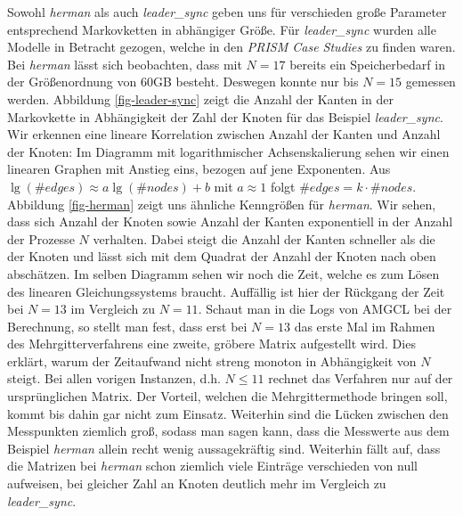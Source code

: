 \documentclass[a4paper]{article}
\theoremstyle{nonumberplain}
\begin{document}
Sowohl \textit{herman} als auch \textit{leader\_sync} geben uns für verschieden große Parameter entsprechend Markovketten in abhängiger Größe. Für \textit{leader\_sync} wurden alle Modelle in Betracht gezogen, welche in den \textit{PRISM Case Studies} \cite{PRISMCS} zu finden waren. Bei \textit{herman} lässt sich beobachten, dass mit $N=17$ bereits ein Speicherbedarf in der Größenordnung von 60GB besteht. Deswegen konnte nur bis $N=15$ gemessen werden. Abbildung \ref{fig-leader-sync} zeigt die Anzahl der Kanten in der Markovkette in Abhängigkeit der Zahl der Knoten für das Beispiel \textit{leader\_sync}. Wir erkennen eine lineare Korrelation zwischen Anzahl der Kanten und Anzahl der Knoten: Im Diagramm mit logarithmischer Achsenskalierung sehen wir einen linearen Graphen mit Anstieg eins, bezogen auf jene Exponenten. Aus $\lg (\#edges) \approx a \lg (\#nodes) + b$ mit $a \approx 1$ folgt $\#edges = k \cdot \#nodes$. Abbildung \ref{fig-herman} zeigt uns ähnliche Kenngrößen für \textit{herman}. Wir sehen, dass sich Anzahl der Knoten sowie Anzahl der Kanten exponentiell in der Anzahl der Prozesse $N$ verhalten. Dabei steigt die Anzahl der Kanten schneller als die der Knoten und lässt sich mit dem Quadrat der Anzahl der Knoten nach oben abschätzen.
Im selben Diagramm sehen wir noch die Zeit, welche es zum Lösen des linearen Gleichungssystems braucht. Auffällig ist hier der Rückgang der Zeit bei $N=13$ im Vergleich zu $N=11$. Schaut man in die Logs von AMGCL bei der Berechnung, so stellt man fest, dass erst bei $N=13$ das erste Mal im Rahmen des Mehrgitterverfahrens eine zweite, gröbere Matrix aufgestellt wird. Dies erklärt, warum der Zeitaufwand nicht streng monoton in Abhängigkeit von $N$ steigt. Bei allen vorigen Instanzen, d.h. $N\leq 11$ rechnet das Verfahren nur auf der ursprünglichen Matrix. Der Vorteil, welchen die Mehrgittermethode bringen soll, kommt bis dahin gar nicht zum Einsatz. Weiterhin sind die Lücken zwischen den Messpunkten ziemlich groß, sodass man sagen kann, dass die Messwerte aus dem Beispiel \textit{herman} allein recht wenig aussagekräftig sind. Weiterhin fällt auf, dass die Matrizen bei \textit{herman} schon ziemlich viele Einträge verschieden von null aufweisen, bei gleicher Zahl an Knoten deutlich mehr im Vergleich zu \textit{leader\_sync}.
\end{document}
